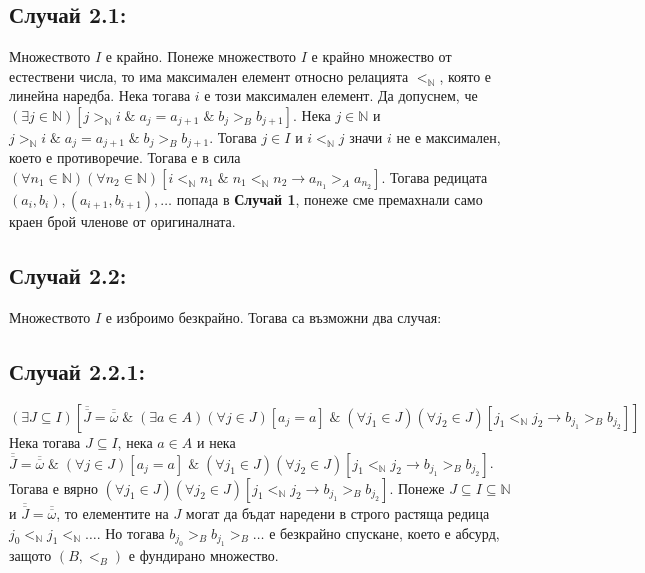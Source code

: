 \documentclass[a4paper, 12pt, oneside]{article}
\begin{document}
\subsection*{Случай 2.1:}
Множеството \(I\) е крайно. Понеже множеството \(I\) е крайно множество от естествени числа,
то има максимален елемент относно релацията \(<_{\mathbb{N}}\), която е линейна наредба.
Нека тогава \(i\) е този максимален елемент. Да допуснем, че \\
\((\exists j \in \mathbb{N})[j >_{\mathbb{N}} i \; \& \; a_{j} = a_{j + 1} \; \& \; b_{j} >_B b_{j + 1}]\).
Нека \(j \in \mathbb{N}\) и \(j >_{\mathbb{N}} i \; \& \; a_{j} = a_{j + 1} \; \& \; b_{j} >_B b_{j + 1}\).
Тогава \(j \in I\) и \(i <_{\mathbb{N}} j\) значи \(i\) не е максимален, което е противоречие. Тогава е в сила 
\((\forall n_1 \in \mathbb{N})(\forall n_2 \in \mathbb{N})[i <_{\mathbb{N}} n_1 \; \& \; n_1 <_{\mathbb{N}} n_2 \longrightarrow a_{n_1} >_A a_{n_2}]\).
Тогава редицата \((a_i, b_i), (a_{i + 1}, b_{i + 1}), \dots\) попада в \textbf{Случай 1},
понеже сме премахнали само краен брой членове от оригиналната.
\subsection*{Случай 2.2:}
Множеството \(I\) е изброимо безкрайно.
Тогава са възможни два случая:
\subsection*{Случай 2.2.1:}
\((\exists J \subseteq I)\left[\overline{\overline{J}} = \overline{\overline{\omega}} \; \& \; (\exists a \in A)(\forall j \in J)[a_j = a] \; \& \; (\forall j_1 \in J)(\forall j_2 \in J)[j_1 <_{\mathbb{N}} j_2 \longrightarrow b_{j_1} >_B b_{j_2}]\right]\) \\
Нека тогава \(J \subseteq I\), нека \(a \in A\) и нека \\
\(\overline{\overline{J}} = \overline{\overline{\omega}} \; \& \; (\forall j \in J)[a_j = a] \; \& \; (\forall j_1 \in J)(\forall j_2 \in J)[j_1 <_{\mathbb{N}} j_2 \longrightarrow b_{j_1} >_B b_{j_2}]\).
Тогава е вярно \((\forall j_1 \in J)(\forall j_2 \in J)[j_1 <_{\mathbb{N}} j_2 \longrightarrow b_{j_1} >_B b_{j_2}]\).
Понеже \(J \subseteq I \subseteq \mathbb{N}\) и \(\overline{\overline{J}} = \overline{\overline{\omega}}\),
то елементите на \(J\) могат да бъдат наредени в строго растяща редица \(j_0 <_{\mathbb{N}} j_1  <_{\mathbb{N}} \dots\).
Но тогава \(b_{j_0} >_B b_{j_1} >_B \dots\) е безкрайно спускане, което е абсурд,
защото \((B, <_B)\) е фундирано множество.\\
\end{document}
